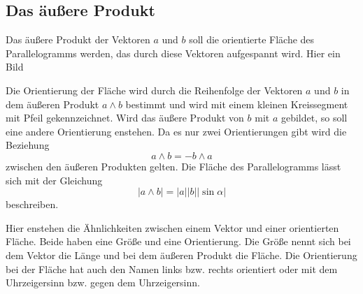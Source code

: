 \documentclass[fleqn]{scrartcl}
\numberwithin{equation}{section}
\begin{document}
\subsection{Das äußere Produkt}
Das äußere Produkt der Vektoren $a$ und $b$ soll die orientierte Fläche des
Parallelogramms werden, das durch diese Vektoren aufgespannt wird. Hier ein
Bild
\begin{center}
\begin{minipage}{\linewidth}
\centering
{}
\label{fig:outherProduct}
\end{minipage}
\end{center}

Die Orientierung der Fläche wird durch die Reihenfolge der Vektoren $a$ und
$b$ in dem äußeren Produkt $a\wedge b$ bestimmt und wird mit einem kleinen
Kreissegment mit Pfeil gekennzeichnet. Wird das äußere Produkt von $b$ mit $a$
gebildet, so soll eine andere Orientierung enstehen. Da es nur zwei
Orientierungen gibt wird die Beziehung
\[a\wedge b = - b\wedge a\]
zwischen den äußeren Produkten gelten. Die Fläche des Parallelogramms lässt
sich mit der Gleichung
\[|a\wedge b| = |a||b||\sin\alpha|\]
beschreiben.

Hier enstehen die Ähnlichkeiten zwischen einem Vektor und einer orientierten
Fläche. Beide haben eine Größe und eine Orientierung. Die Größe nennt sich bei
dem Vektor die Länge und bei dem äußeren Produkt die Fläche. Die Orientierung
bei der Fläche hat auch den Namen links bzw. rechts orientiert oder mit dem
Uhrzeigersinn bzw. gegen dem Uhrzeigersinn.
\end{document}
